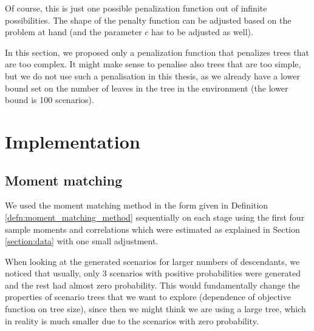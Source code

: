 Of course, this is just one possible penalization function out of infinite possibilities. The shape of the penalty function can be adjusted based on the problem at hand (and the parameter $c$ has to be adjusted as well).

In this section, we proposed only a penalization function that penalizes trees that are too complex. It might make sense to penalise also trees that are too simple, but we do not use such a penalisation in this thesis, as we already have a lower bound set on the number of leaves in the tree in the environment (the lower bound is 100 scenarios).

\section{Implementation}
\subsection{Moment matching}
\label{subsection:moment_matching}
We used the moment matching method in the form given in Definition \ref{defn:moment_matching_method} sequentially on each stage using the first four sample moments and correlations which were estimated as explained in Section \ref{section:data} with one small adjustment. 

When looking at the generated scenarios for larger numbers of descendants, we noticed that usually, only 3 scenarios with positive probabilities were generated and the rest had almost zero probability. This would fundamentally change the properties of scenario trees that we want to explore (dependence of objective function on tree size), since then we might think we are using a large tree, which in reality is much smaller due to the scenarios with zero probability. 

